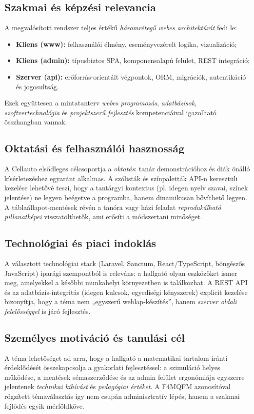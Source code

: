 \subsection{Szakmai és képzési relevancia}
A megvalósított rendszer teljes értékű \emph{háromrétegű webes architektúrát} fedi le:
\begin{itemize}
  \item \textbf{Kliens (www):} felhasználói élmény, eseményvezérelt logika, vizualizáció;
  \item \textbf{Kliens (admin):} típusbiztos SPA, komponensalapú felület, REST integráció;
  \item \textbf{Szerver (api):} erőforrás-orientált végpontok, ORM, migrációk, autentikáció és jogosultság.
\end{itemize}
Ezek együttesen a mintatanterv \emph{webes programozás}, \emph{adatbázisok}, \emph{szoftvertechnológia} és \emph{projektszerű fejlesztés} kompetenciáival igazolható összhangban vannak.

\subsection{Oktatási és felhasználói hasznosság}
A Cellauto elsődleges célcsoportja a \emph{oktatás}: tanár demonstrációhoz és diák önálló kísérletezéshez egyaránt alkalmas. A szólisták és színpaletták API-n keresztüli kezelése lehetővé teszi, hogy a tantárgyi kontextus (pl. idegen nyelv szavai, színek jelentése) ne legyen beégetve a programba, hanem dinamikusan bővíthető legyen. A táblaállapot-mentések révén a tanóra vagy házi feladat \emph{reprodukálható pillanatképei} visszatölthetők, ami erősíti a módszertani minőséget.

\subsection{Technológiai és piaci indoklás}
A választott technológiai stack (Laravel, Sanctum, React/TypeScript, böngészős JavaScript) iparági szempontból is releváns: a hallgató olyan eszközöket ismer meg, amelyekkel a későbbi munkahelyi környezetben is találkozhat. A REST API és az adatbázis-integritás (idegen kulcsok, egyediségi kényszerek) explicit kezelése bizonyítja, hogy a téma nem „egyszerű weblap-készítés”, hanem \emph{szerver oldali felelősséggel} is járó fejlesztés.

\subsection{Személyes motiváció és tanulási cél}
A téma lehetőséget ad arra, hogy a hallgató a matematikai tartalom iránti érdeklődését összekapcsolja a gyakorlati fejlesztéssel: a szimuláció helyes működése, a mentések sémaszerződése és az admin felület ergonómiája egyszerre jelentenek \emph{technikai kihívást} és \emph{pedagógiai értéket}. A F4MQFM azonosítóval rögzített témaválasztás így nem csupán adminisztratív lépés, hanem a szakmai fejlődés egyik mérföldköve.

